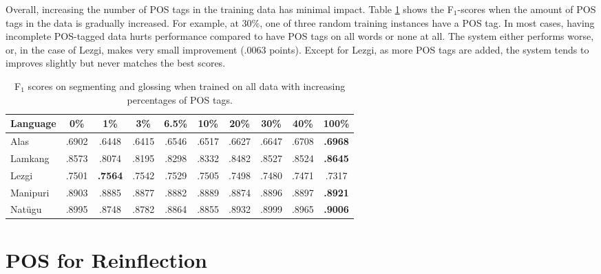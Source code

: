Overall, increasing the number of POS tags in the training data has minimal impact. Table \ref{tab:POSSGpsp} shows the F$_1$-scores when the amount of POS tags in the data is gradually increased. For example, at 30\%, one of three random training instances have a POS tag. In most cases, having incomplete POS-tagged data hurts performance compared to have POS tags on all words or none at all. 
The system either performs worse, or, in the case of Lezgi, makes very small improvement (.0063 points). Except for Lezgi, as more POS tags are added, the system tends to improves slightly but never matches the best scores. 


\begin{table}[htb]
    \centering
    \begin{tabular}{l|ccccccccc}
       \textbf{Language} & \textbf{0\%} & \textbf{1\%} & \textbf{3\%} & \textbf{6.5\%} & \textbf{10\%} & \textbf{20\%} & \textbf{30\%} & \textbf{40\%} & \textbf{100\%}  \\
       \hline
       Alas  & .6902 & .6448  & .6415 & .6546 & .6517 & .6627 & .6647 & .6708 & \textbf{.6968} \\
       \hline
       Lamkang & .8573 & .8074 & .8195 & .8298 & .8332 & .8482 & .8527 & .8524 & \textbf{.8645}  \\
       \hline
       Lezgi  & .7501 & \textbf{.7564} & .7542 & .7529 & .7505 & .7498 & .7480  & .7471 & .7317 \\
       \hline
       Manipuri & .8903 & .8885 & .8877 & .8882 & .8889 & .8874 & .8896 & .8897 & \textbf{.8921} \\
       \hline
       Nat\"ugu & .8995 & .8748 & .8782 & .8864 & .8855 & .8932 & .8999 & .8965 & \textbf{.9006} \\
    \end{tabular}
    \caption[Results with More POS Tags]{F$_1$ scores on segmenting and glossing when trained on all data with increasing percentages of POS tags.}
    \label{tab:POSSGpsp}
\end{table}



\section{POS for Reinflection}
\label{sec:inflection}

